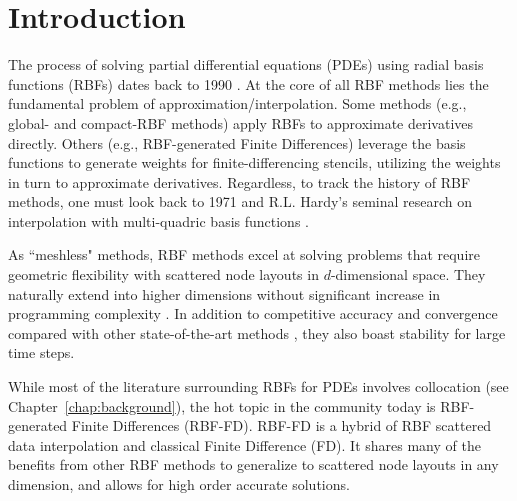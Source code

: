 \documentclass[11pt]{report}
\begin{document}
\tableofcontents
\fi

{ \graphicspath{{rbffd_methods_content/}} 





\chapter{Introduction}
\label{chap:introduction}

The process of solving partial differential equations (PDEs) using radial basis functions (RBFs) dates back to 1990 \cite{Kansa1990a,Kansa1990b}. At the core of all RBF methods lies the fundamental problem of approximation/interpolation. Some methods (e.g., global- and compact-RBF methods) apply RBFs to approximate derivatives directly. Others (e.g., RBF-generated Finite Differences) leverage the basis functions to generate weights for finite-differencing stencils, utilizing the weights in turn to approximate derivatives. Regardless, to track the history of RBF methods, one must look back to 1971 and R.L. Hardy's seminal research on interpolation with multi-quadric basis functions \cite{Hardy1971}. 

As ``meshless" methods, RBF methods excel at solving problems that require geometric flexibility with scattered node layouts in $d$-dimensional space. They naturally extend into higher dimensions without significant increase in programming complexity \cite{FlyerWright07,WrightFlyerYuen10}. In addition to competitive accuracy and convergence compared with other state-of-the-art methods \cite{FlyerWright07, FlyerWright09, FlyerLehto10, WrightFlyerYuen10, FlyerFornberg11}, they also boast stability for large time steps.

While most of the literature surrounding RBFs for PDEs involves collocation (see Chapter~\ref{chap:background}), the hot topic in the community today is RBF-generated Finite Differences (RBF-FD). RBF-FD is a hybrid of RBF scattered data interpolation and classical Finite Difference (FD). It shares many of the benefits from other RBF methods to generalize to scattered node layouts in any dimension, and allows for high order accurate solutions.

}
\end{document}
